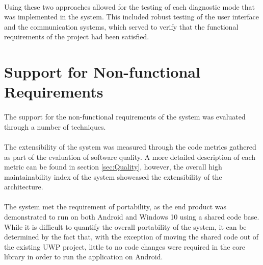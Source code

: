 	\paragraph{}{
	Using these two approaches allowed for the testing of each diagnostic mode that was implemented in the system. This included robust testing of the user interface and the communication systems, which served to verify that the functional requirements of the project had been satisfied. 
	}
	
	
		
\section{Support for Non-functional Requirements}	
	\paragraph{}{
	The support for the non-functional requirements of the system was evaluated through a number of techniques.
	}
	\paragraph{}{
	The extensibility of the system was measured through the code metrics gathered as part of the evaluation of software quality. A more detailed description of each metric can be found in section \ref{sec:Quality}, however, the overall high maintainability index of the system showcased the extensibility of the architecture.
	}
	\paragraph{}{
	The system met the requirement of portability, as the end product was demonstrated to run on both Android and Windows 10 using a shared code base. While it is difficult to quantify the overall portability of the system, it can be determined by the fact that, with the exception of moving the shared code out of the existing UWP project, little to no code changes were required in the core library in order to run the application on Android.
	}
